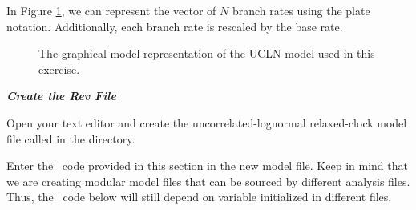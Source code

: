 In Figure \ref{m_UCLN:fig}, we can represent the vector of $N$ branch rates using the plate notation. Additionally, each branch rate is rescaled by the base rate. 
\begin{figure}[h!]
\centering
{}
\caption{\small The graphical model representation of the UCLN model used in this exercise.}
\label{m_UCLN:fig}
\end{figure}


%
%
%

\textbf{\textit{Create the Rev File}}

{\begin{framed}
Open your text editor and create the uncorrelated-lognormal relaxed-clock model file called {\textcolor{red}{}} in the  directory.

Enter the \Rev~code provided in this section in the new model file. Keep in mind that we are creating modular model files that can be sourced by different analysis files. Thus, the \Rev~code below will still depend on variable initialized in different files.
\end{framed}}


